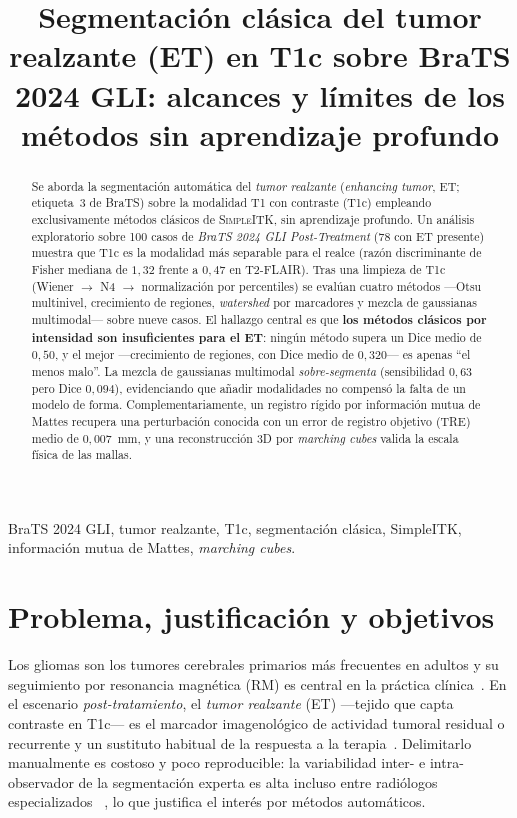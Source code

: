 \documentclass[conference]{IEEEtran}
\title{Segmentación clásica del tumor realzante (ET) en T1c
sobre BraTS 2024 GLI: alcances y límites de los métodos sin
aprendizaje profundo}
\author{\IEEEauthorblockN{Abel Albuez, Victoria Acero y Santiago Gil}
\IEEEauthorblockA{Maestría en Ingeniería de Sistemas y Computación\\
Pontificia Universidad Javeriana, Bogotá D.C., Colombia\\
Procesamiento de Imágenes Médicas \quad 2026\\
Repositorio: \url{https://github.com/AbelAlbuez/medical-image-processing}}}
\begin{document}
\maketitle

\begin{abstract}
Se aborda la segmentación automática del \emph{tumor realzante}
(\textit{enhancing tumor}, ET; etiqueta~3 de BraTS) sobre la
modalidad T1 con contraste (T1c) empleando exclusivamente métodos
clásicos de \textsc{SimpleITK}, sin aprendizaje profundo. Un
análisis exploratorio sobre 100 casos de \textit{BraTS 2024 GLI
Post-Treatment} (78 con ET presente) muestra que T1c es la
modalidad más separable para el realce (razón discriminante de
Fisher mediana de $1{,}32$ frente a $0{,}47$ en T2-FLAIR). Tras
una limpieza de T1c (Wiener $\rightarrow$ N4 $\rightarrow$
normalización por percentiles) se evalúan cuatro métodos
---Otsu multinivel, crecimiento de regiones, \textit{watershed}
por marcadores y mezcla de gaussianas multimodal--- sobre nueve
casos. El hallazgo central es que \textbf{los métodos clásicos por
intensidad son insuficientes para el ET}: ningún método supera un
Dice medio de $0{,}50$, y el mejor ---crecimiento de regiones, con
Dice medio de $0{,}320$--- es apenas ``el menos malo''. La mezcla
de gaussianas multimodal \emph{sobre-segmenta} (sensibilidad
$0{,}63$ pero Dice $0{,}094$), evidenciando que añadir modalidades
no compensó la falta de un modelo de forma. Complementariamente,
un registro rígido por información mutua de Mattes recupera una
perturbación conocida con un error de registro objetivo (TRE)
medio de $0{,}007$~mm, y una reconstrucción 3D por
\textit{marching cubes} valida la escala física de las mallas.
\end{abstract}

\begin{IEEEkeywords}
BraTS 2024 GLI, tumor realzante, T1c, segmentación clásica,
SimpleITK, información mutua de Mattes, \textit{marching cubes}.
\end{IEEEkeywords}

\section{Problema, justificación y objetivos}
Los gliomas son los tumores cerebrales primarios más frecuentes en
adultos y su seguimiento por resonancia magnética (RM) es central
en la práctica clínica~\cite{louis2021who,mesfin2024gliomas}. En el
escenario \emph{post-tratamiento}, el \emph{tumor realzante} (ET)
---tejido que capta contraste en T1c--- es el marcador imagenológico
de actividad tumoral residual o recurrente y un sustituto habitual
de la respuesta a la terapia~\cite{bhattacharya2024posttreatment}.
Delimitarlo manualmente es costoso y poco reproducible: la
variabilidad inter- e intra-observador de la segmentación experta
es alta incluso entre radiólogos especializados
~\cite{visser2019interobserver}, lo que justifica el interés por
métodos automáticos.
\end{document}
